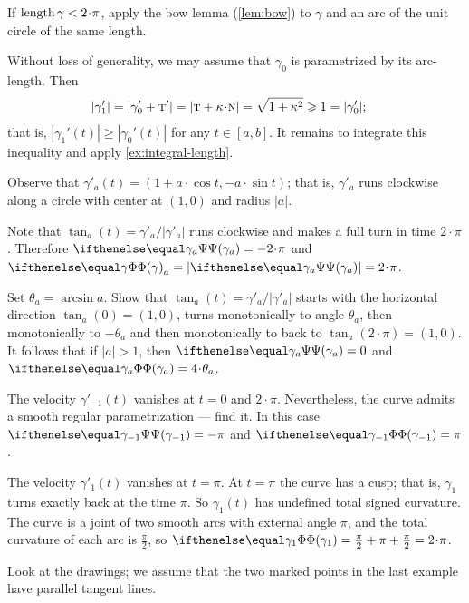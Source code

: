  If $\length\gamma<2\cdot\pi$, apply the bow lemma (\ref{lem:bow}) to $\gamma$ and an arc of the unit circle of the same length.



\setcounter{eqtn}{0}



Without loss of generality, we may assume that $\gamma_0$ is parametrized by its arc-length.
Then
\begin{align*}
|\gamma_1'|&=|\gamma_0'+\tan'|=|\tan+\kur\cdot\norm|=
\sqrt{1+\kur^2}\ge
1=
|\gamma_0'|;
\end{align*}
that is, $|\gamma_1'(t)|\ge|\gamma_0'(t)|$ for any $t\in[a,b]$.
It remains to integrate this inequality and apply 
\ref{ex:integral-length}.


Observe that $\gamma'_a(t)=(1+a\cdot \cos t, -a\cdot \sin t)$;
that is, $\gamma'_a$ runs clockwise along a circle with center at $(1,0)$ and radius $\vert a \vert$.

 Note that $\tan_a(t)=\gamma'_a/|\gamma'_a|$ runs clockwise and makes a full turn in time $2\cdot\pi$.
Therefore $\tgc{\gamma_a}=-2\cdot\pi$ and $\tc\gamma_a=|\tgc{\gamma_a}|=2\cdot\pi$.

Set $\theta_a=\arcsin a$.
Show that $\tan_a(t)=\gamma'_a/|\gamma'_a|$ starts with the horizontal direction $\tan_a(0)=(1,0)$, turns monotonically to angle $\theta_a$, then monotonically to $-\theta_a$ and then monotonically to back to $\tan_a(2\cdot\pi)=(1,0)$.
It follows that if $|a|>1$, then
$\tgc{\gamma_a}=0$ and $\tc{\gamma_a}=4\cdot\theta_a$.

The velocity $\gamma'_{-1}(t)$ vanishes at $t=0$ and $2\cdot\pi$.
Nevertheless, the curve admits a smooth regular parametrization --- find it.
In this case $\tgc{\gamma_{-1}}=-\pi$ and $\tc{\gamma_{-1}}=\pi$.

The velocity $\gamma'_1(t)$ vanishes at $t=\pi$.
At $t=\pi$ the curve has a cusp;
that is, $\gamma_1$ turns exactly back at the time $\pi$.
So $\gamma_1(t)$ has undefined total signed curvature.
The curve is a joint of two smooth arcs with external angle $\pi$, and
the total curvature of each arc is $\tfrac\pi2$, so 
$\tc{\gamma_{1}}=\tfrac\pi2+\pi+\tfrac\pi2=2\cdot\pi$.


Look at the drawings; we assume that the two marked points in the last example have parallel tangent lines.

